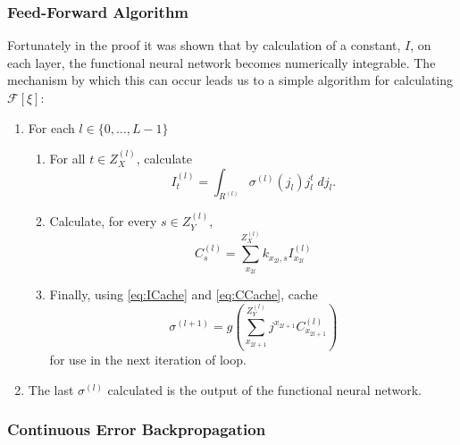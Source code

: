     
    \subsubsection{Feed-Forward Algorithm}
    Fortunately in the proof it was shown that by calculation of a constant, $I$, on each layer, the functional neural network becomes numerically integrable. The mechanism by which this can occur leads us to a simple algorithm for calculating
    $\mathcal{F}[\xi]$:
    
    \begin{enumerate}
    \item  For each $l \in \{0,\dots,L-1\}$
      \begin{enumerate}
      \item For all $t \in Z^{(l)}_X$, calculate
         \begin{equation} \label{eq:ICache} 
            I^{(l)}_t = \int_{R^{(l)}} \sigma^{(l)}(j_l)j_l^{t}\;dj_l.
         \end{equation}

       \item Calculate, for every $s \in Z^{(l)}_Y$,
         \begin{equation} \label{eq:CCache}
            C^{(l)}_{s} = \sum_{x_{2l}}^{Z^{(l)}_X} k_{x_{2l},s} I^{(l)}_{x_{2l}} 
         \end{equation}

        \item Finally, using \eqref{eq:ICache} and \eqref{eq:CCache}, cache 
          \begin{equation}
            \sigma^{(l+1)}=g\left(\sum_{x_{2l+1}}^{Z^{(l)}_Y} j^{x_{2l+1}} C^{(l)}_{x_{2l+1}}\right)
          \end{equation}
          for use in the next iteration of loop.
      \end{enumerate}
      \item The last $\sigma^{(l)}$ calculated is the output of the functional neural network.
    \end{enumerate}











\subsubsection{Continuous Error Backpropagation}

